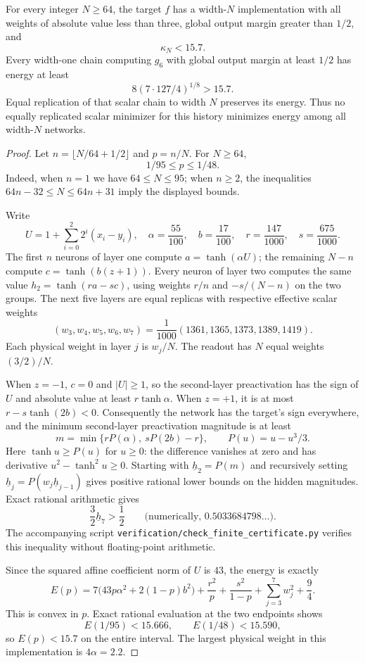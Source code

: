 \begin{proposition}
For every integer $N\ge64$, the target $f$ has a width-$N$ implementation
with all weights of absolute value less than three, global output margin
greater than $1/2$, and
\[
 \kappa_N<15.7.
\]
Every width-one chain computing $g_6$ with global output margin at least
$1/2$ has energy at least
\[
 8(7\cdot127/4)^{1/8}>15.7.
\]
Equal replication of that scalar chain to width $N$ preserves its energy.
Thus no equally replicated scalar minimizer for this history minimizes
energy among all width-$N$ networks.
\end{proposition}
\begin{proof}
Let $n=\lfloor N/64+1/2\rfloor$ and $p=n/N$. For $N\ge64$,
\[
 1/95\le p\le1/48.
\]
Indeed, when $n=1$ we have $64\le N\le95$; when $n\ge2$, the inequalities
$64n-32\le N\le64n+31$ imply the displayed bounds.

Write
\[
 U=1+\sum_{i=0}^2 2^i(x_i-y_i),\quad
 \alpha=\frac{55}{100},\quad b=\frac{17}{100},\quad
 r=\frac{147}{1000},\quad s=\frac{675}{1000}.
\]
The first $n$ neurons of layer one compute $a=\tanh(\alpha U)$;
the remaining $N-n$ compute $c=\tanh(b(z+1))$. Every neuron of layer two
computes the same value $h_2=\tanh(ra-sc)$, using weights $r/n$ and
$-s/(N-n)$ on the two groups. The next five layers are equal replicas
with respective effective scalar weights
\[
 (w_3,w_4,w_5,w_6,w_7)
   =\frac1{1000}(1361,1365,1373,1389,1419).
\]
Each physical weight in layer $j$ is $w_j/N$. The readout has $N$ equal
weights $(3/2)/N$.

When $z=-1$, $c=0$ and $|U|\ge1$, so the second-layer preactivation
has the sign of $U$ and absolute value at least $r\tanh\alpha$.
When $z=+1$, it is at most $r-s\tanh(2b)<0$.
Consequently the network has the target's sign everywhere, and the
minimum second-layer preactivation magnitude is at least
\[
 m=\min\{r P(\alpha),\ sP(2b)-r\},\qquad P(u)=u-u^3/3.
\]
Here $\tanh u\ge P(u)$ for $u\ge0$: the difference vanishes at zero
and has derivative $u^2-\tanh^2u\ge0$.
Starting with $\underline h_2=P(m)$ and recursively setting
$\underline h_j=P(w_j\underline h_{j-1})$ gives positive rational
lower bounds on the hidden magnitudes. Exact rational arithmetic gives
\[
 \frac32\underline h_7>\frac12
 \qquad\text{(numerically, }0.5033684798\ldots\text{)}.
\]
The accompanying script \texttt{verification/check\_finite\_certificate.py}
verifies this inequality without floating-point arithmetic.

Since the squared affine coefficient norm of $U$ is $43$, the energy is
exactly
\[
 E(p)=7\bigl(43p\alpha^2+2(1-p)b^2\bigr)
       +\frac{r^2}{p}+\frac{s^2}{1-p}
       +\sum_{j=3}^7w_j^2+\frac94.
\]
This is convex in $p$. Exact rational evaluation at the two endpoints
shows
\[
 E(1/95)<15.666,\qquad E(1/48)<15.590,
\]
so $E(p)<15.7$ on the entire interval. The largest physical weight in
this implementation is $4\alpha=2.2$.


\end{proof}
